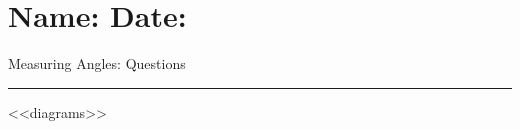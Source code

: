 \documentclass[leqno, 12pt]{article}
\def \HeadingQuestions {\section*{\Large Name: \underline{\hspace{8cm}} \hfill Date: \underline{\hspace{3cm}}} \vspace{-3mm}
{Measuring Angles: Questions} \vspace{1pt}\hrule}
\begin{document}
\HeadingQuestions
\begin{multicols}{2}

<<diagrams>>

\end{multicols}
\end{document}
